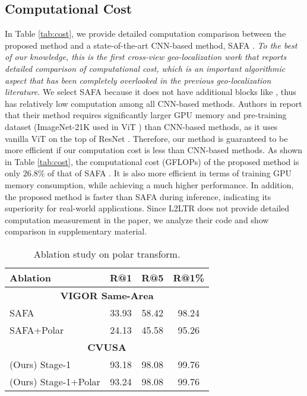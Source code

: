 \documentclass[10pt,twocolumn,letterpaper]{article}
\begin{document}
\subsection{Computational Cost}
\label{sec:cost}
In Table \ref{tab:cost}, we provide detailed computation comparison between the proposed method and a state-of-the-art CNN-based method, \ie SAFA \cite{SAFA}. \emph{To the best of our knowledge, this is the first cross-view geo-localization work that reports detailed comparison of computational cost, which is an important algorithmic aspect that has been completely overlooked in the previous geo-localization literature.} We select SAFA because it does not have additional blocks like \cite{UCF,toker2021coming}, thus has relatively low computation among all CNN-based methods. Authors in \cite{yang2021cross} report that their method requires significantly larger GPU memory and pre-training dataset (ImageNet-21K used in ViT \cite{vit}) than CNN-based methods, as it uses vanilla ViT on the top of ResNet \cite{he2016deep}. Therefore, our method is guaranteed to be more efficient if our computation cost is less than CNN-based methods. As shown in Table \ref{tab:cost}, the computational cost (GFLOPs) of the proposed method is only $26.8\%$ of that of SAFA \cite{SAFA}. It is also more efficient in terms of training GPU memory consumption, while achieving a much higher performance. In addition, the proposed method is faster than SAFA during inference, indicating its superiority for real-world applications. Since L2LTR \cite{yang2021cross} does not provide detailed computation measurement in the paper, we analyze their code and show comparison in supplementary material.

\begin{table}[!htbp]
\small
\centering
\begin{tabular}{l c c c } \hline

\hline
Ablation & R@1 & R@5 & R@1\% \\\hline
\hline
 \multicolumn{4}{c}{\textbf{VIGOR Same-Area}}\\
\hline
SAFA \cite{SAFA,zhu2021vigor} &  33.93 & 58.42 & 98.24  \\
SAFA+Polar & 24.13 & 45.58 & 95.26  \\
\hline
 \multicolumn{4}{c}{\textbf{CVUSA}}\\
\hline
(Ours) Stage-1 &  93.18 & 98.08 & 99.76\\
(Ours) Stage-1+Polar &  93.24 & 98.08 & 99.76 \\
\hline

\hline
\end{tabular}
\caption{Ablation study on polar transform.}
\label{tab:polar}
\vspace{-0.2cm}
\end{table}
\end{document}
